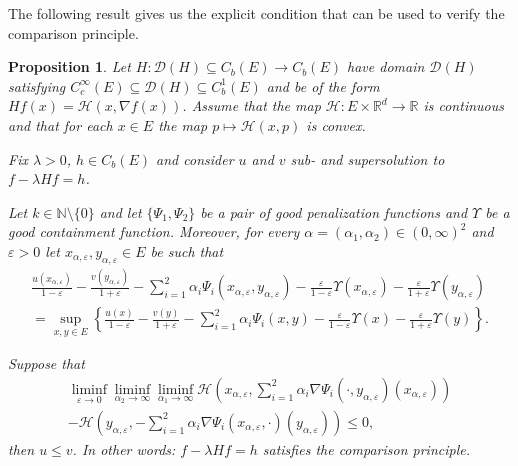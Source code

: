 \documentclass[a4paper]{article}
\newcommand{\cD}{\mathcal{D}}
\newcommand{\cH}{\mathcal{H}}
\newcommand{\bN}{\mathbb{N}}
\newcommand{\bR}{\mathbb{R}}
\numberwithin{equation}{section}
\newtheorem{proposition}[theorem]{Proposition}
\theoremstyle{definition}
\begin{document}
The following result gives us the explicit condition that can be used to verify the comparison principle.







\begin{proposition} \label{proposition:comparison_conditions_on_H}
	Let $H : \cD(H) \subseteq C_b(E) \rightarrow C_b(E)$ have domain $\cD(H)$ satisfying $C_c^\infty(E) \subseteq \cD(H) \subseteq C_b^1(E)$ and be of the form $Hf(x) = \cH(x,\nabla f(x))$. Assume that the map $\cH : E \times \bR^d \rightarrow \bR$ is continuous and that for each $x \in E$ the map $p \mapsto \cH(x,p)$ is convex.
	
	Fix $\lambda >0$, $h \in C_b(E)$ and consider $u$ and $v$ sub- and supersolution to $f - \lambda Hf = h$.
	
	\smallskip
	
	Let $k \in \bN \setminus \{0\}$ and let $\{\Psi_1,\Psi_2\}$ be a pair of good penalization functions and $\Upsilon$ be a good containment function. Moreover, for every $\alpha = (\alpha_1,\alpha_2) \in (0,\infty)^2$ and $\varepsilon >0$ let $x_{\alpha,\varepsilon},y_{\alpha,\varepsilon} \in E$ be such that
	\begin{multline} \label{eqn:comparison_principle_proof_choice_of_sequences}
		\frac{u(x_{\alpha,\varepsilon})}{1-\varepsilon} - \frac{v(y_{\alpha,\varepsilon})}{1+\varepsilon} -  \sum_{i=1}^2 \alpha_i \Psi_i(x_{\alpha,\varepsilon},y_{\alpha,\varepsilon}) - \frac{\varepsilon}{1-\varepsilon}\Upsilon(x_{\alpha,\varepsilon}) -\frac{\varepsilon}{1+\varepsilon}\Upsilon(y_{\alpha,\varepsilon}) \\
		= \sup_{x,y \in E} \left\{\frac{u(x)}{1-\varepsilon} - \frac{v(y)}{1+\varepsilon} - \sum_{i=1}^2 \alpha_i \Psi_i(x,y)  - \frac{\varepsilon}{1-\varepsilon}\Upsilon(x) - \frac{\varepsilon}{1+\varepsilon}\Upsilon(y)\right\}.
	\end{multline}
	
	Suppose that
	\begin{multline}\label{condH:negative:liminf}
		\liminf_{\varepsilon \rightarrow 0} \liminf_{\alpha_2 \rightarrow \infty}  \liminf_{\alpha_1 \rightarrow \infty} \cH\left(x_{\alpha,\varepsilon},\sum_{i=1}^2 \alpha_i \nabla \Psi_i(\cdot,y_{\alpha,\varepsilon})(x_{\alpha,\varepsilon})\right) \\
		- \cH\left(y_{\alpha,\varepsilon},- \sum_{i=1}^2 \alpha_i \nabla \Psi_i(x_{\alpha,\varepsilon},\cdot)(y_{\alpha,\varepsilon})\right) \leq 0,
	\end{multline}
	then $u \leq v$. In other words: $f - \lambda H f = h$ satisfies the comparison principle. 
\end{proposition}
\end{document}
